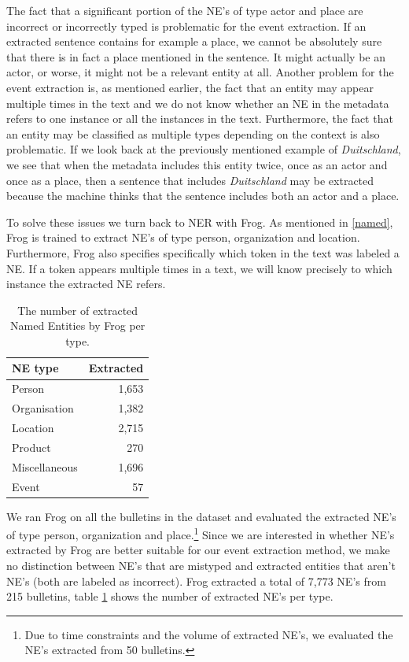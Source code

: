 \documentclass[a4paper, 10pt, conference]{ieeeconf}      %
\begin{document}
The fact that a significant portion of the NE's of type actor and place are incorrect or incorrectly typed is problematic for the event extraction. If an extracted sentence contains for example a place, we cannot be absolutely sure that there is in fact a place mentioned in the sentence. It might actually be an actor, or worse, it might not be a relevant entity at all.
Another problem for the event extraction is, as mentioned earlier, the fact that an entity may appear multiple times in the text and we do not know whether an NE in the metadata refers to one instance or all the instances in the text. Furthermore, the fact that an entity may be classified as multiple types depending on the context is also problematic. If we look back at the previously mentioned example of \textit{Duitschland}, we see that when the metadata includes this entity twice, once as an actor and once as a place, then a sentence that includes \textit{Duitschland} may be extracted because the machine thinks that the sentence includes both an actor and a place.

To solve these issues we turn back to NER with Frog. As mentioned in \ref{named}, Frog is trained to extract NE's of type person, organization and location. Furthermore, Frog also specifies specifically which token in the text was labeled a NE. If a token appears multiple times in a text, we will know precisely to which instance the extracted NE refers. 

\begin{table}
  \begin{center}
    \begin{tabular}{l|r}
    NE type & Extracted\\
    \hline
    Person & 1,653\\
    Organisation & 1,382\\
    Location & 2,715\\
    Product & 270\\
    Miscellaneous & 1,696\\
    Event & 57\\
    \end{tabular}
  \end{center}
  \caption{The number of extracted Named Entities by Frog per type.}
  \label{Frog extraction breakdown}
\end{table}

We ran Frog on all the bulletins in the dataset and evaluated the extracted NE's of type person, organization and place.\footnote{Due to time constraints and the volume of extracted NE's, we evaluated the NE's extracted from 50 bulletins.} Since we are interested in whether NE's extracted by Frog are better suitable for our event extraction method, we make no distinction between NE's that are mistyped and extracted entities that aren't NE's (both are labeled as incorrect). Frog extracted a total of 7,773 NE's from 215 bulletins, table \ref{Frog extraction breakdown} shows the number of extracted NE's per type. 
\end{document}
